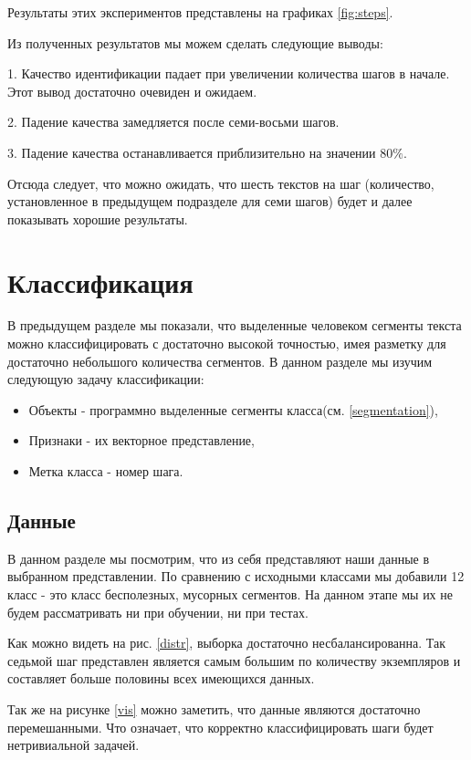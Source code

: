 \documentclass[12pt]{article}
\begin{document}
Результаты этих экспериментов представлены на графиках \ref{fig:steps}.

Из полученных результатов мы можем сделать следующие выводы:

1. Качество идентификации падает при увеличении количества шагов в начале. Этот вывод достаточно очевиден и ожидаем.

2. Падение качества замедляется после семи-восьми шагов.

3. Падение качества останавливается приблизительно на значении 80$\%$.

Отсюда следует, что можно ожидать, что шесть текстов на шаг (количество, установленное в предыдущем подразделе для семи шагов) будет и далее показывать хорошие результаты.

\section{Классификация}
\label{classification}

В предыдущем разделе мы показали, что выделенные человеком сегменты текста можно классифицировать с достаточно высокой точностью, имея разметку для достаточно небольшого количества сегментов. В данном разделе мы изучим следующую задачу классификации:
\begin{itemize}
	\item Объекты - программно выделенные сегменты класса(см. \ref{segmentation}),
	\item Признаки - их векторное представление,
	\item Метка класса - номер шага.
\end{itemize}

\subsection{Данные}

В данном разделе мы посмотрим, что из себя представляют наши данные в выбранном представлении. По сравнению с исходными классами мы добавили 12 класс - это класс бесполезных, мусорных сегментов. На данном этапе мы их не будем рассматривать ни при обучении, ни при тестах.

Как можно видеть на рис. \ref{distr}, выборка достаточно несбалансированна. Так седьмой шаг представлен является самым большим по количеству экземпляров и составляет больше половины всех имеющихся данных.

Так же на рисунке \ref{vis} можно заметить, что данные являются достаточно перемешанными. Что означает, что корректно классифицировать шаги будет нетривиальной задачей.
\end{document}

